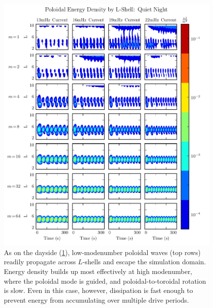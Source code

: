 \begin{figure}[!htb]
    \centering
    \includegraphics[width=\textwidth]{figures/layers_night_p.pdf}
    \caption[Nightside Poloidal Energy Distribution]{
      As on the dayside (\cref{fig_layers_night_p}), low-modenumber poloidal waves (top rows) readily propagate across $L$-shells and escape the simulation domain. Energy density builds up most effectively at high modenumber, where the poloidal mode is guided, and poloidal-to-toroidal rotation is slow. Even in this case, however, dissipation is fast enough to prevent energy from accumulating over multiple drive periods. 
    }
    \label{fig_layers_night_p}
\end{figure}

